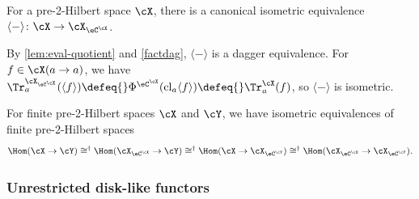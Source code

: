 \documentclass[12pt,reqno]{amsart}
\newcommand{\cl}{\mathrm{cl}}
\newcommand{\psn}{\Phi}
\begin{document}
\begin{proposition}
\label{prop:XCXcongX}
For a pre-2-Hilbert space $\cX$, there is a canonical isometric equivalence $\langle-\rangle\colon\cX\to\cX_{\eC^\cX}$.
\end{proposition}

\begin{pf}
By \cref{lem:eval-quotient} and \cref{factdag}, $\langle-\rangle$ is a dagger equivalence. For $f \in \cX(a\to a)$, we have $\Tr_a^{\cX_{\eC^\cX}}(\langle f\rangle) \defeq{} \psn^{\eC^\cX}(\cl_a \langle f\rangle) \defeq{} \Tr_a^\cX(f)$, so $\langle-\rangle$ is isometric.
\end{pf}

\begin{corollary}
\label{cor:XCXcongX implies homs}
For finite pre-2-Hilbert spaces $\cX$ and $\cY$, we have isometric equivalences of finite pre-2-Hilbert spaces
    \[
        \Hom(\cX\to\cY)
        \cong^\dag
        \Hom(\cX_{\eC^\cX}\to\cY)
        \cong^\dag
        \Hom(\cX\to\cX_{\eC^\cY})
        \cong^\dag
        \Hom(\cX_{\eC^\cX}\to\cX_{\eC^\cY}).
    \]
\end{corollary}

\subsubsection{Unrestricted disk-like functors}


\
\end{document}
